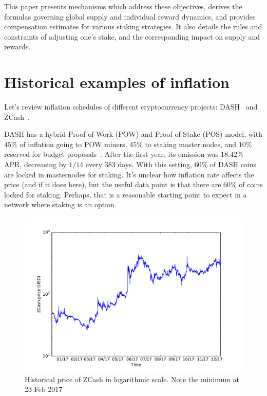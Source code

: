 \documentclass[longbibliography,nofootinbib,twocolumn]{revtex4-1}
\begin{document}
This paper presents mechanisms which address these objectives, derives the formulas governing global supply and individual reward dynamics, and provides compensation estimates for various staking strategies. It also details the rules and constraints of adjusting one's stake, and the corresponding impact on supply and rewards.

\section{Historical examples of inflation}

Let's review inflation schedules of different cryptocurrency projects:
DASH~\cite{dash:whitepaper} and ZCash~\cite{zcash}.

DASH has a hybrid Proof-of-Work (POW) and Proof-of-Stake (POS) model,
with $45\%$ of inflation going to POW miners, $45\%$ to staking master nodes, and $10\%$ reserved for budget proposals~\cite{dash:emission}.
After the first year, its emission was $18.42\%$ APR, decreasing by $1/14$ every $383$ days.
With this setting, $60\%$ of DASH coins are locked in masternodes for staking.
It's unclear how inflation rate affects the price (and if it does here), but the useful data point is that there are $60\%$ of coins locked for staking.
Perhaps, that is a reasonable starting point to expect in a network where staking is an option.

\begin{figure}
    \includegraphics[width=\columnwidth]{pdf/zcash-price.pdf}
    \caption{Historical price of ZCash in logarithmic scale. Note the minimum at 23 Feb 2017}
    \label{fig:zec}
\end{figure}
\end{document}
